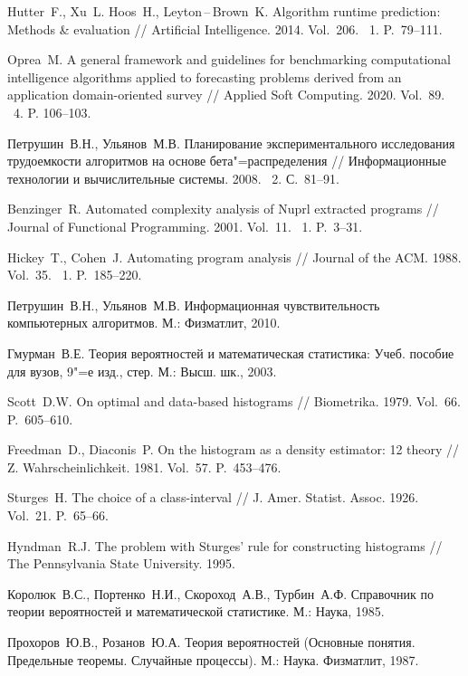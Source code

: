 \documentclass[a4paper, article, 14pt]{extarticle}
\newcommand*{\No}{\textnumero}
\begin{document}
\begin{thebibliography}{1}
	 Hutter~F., Xu~L. Hoos~H., Leyton\,--\,Brown~K. Algorithm runtime prediction: Methods \& evaluation // Artificial Intelligence. 2014. Vol.~206. \No~1. P.~79--111.

	 Oprea~M. A general framework and guidelines for benchmarking computational intelligence algorithms applied to forecasting problems derived from an application domain-oriented survey // Applied Soft Computing. 2020. Vol.~89. \No~4. P. 106--103.

	 Петрушин~В.\:Н., Ульянов~М.\:В. Планирование экспериментального исследования трудоемкости алгоритмов на основе бета"=распределения // Информационные технологии и вычислительные системы. 2008. \No~2. С.~81--91.

	 Benzinger~R. Automated complexity analysis of Nuprl extracted programs // Journal of Functional Programming. 2001. Vol.~11. \No~1. P.~3--31.
	
	 Hickey~T., Cohen~J. Automating program analysis // Journal of the ACM. 1988. Vol.~35. \No~1. P.~185--220.

	 Петрушин~В.\:Н., Ульянов~М.\:В. Информационная чувствительность компьютерных алгоритмов. М.: Физматлит, 2010.

	 Гмурман~В.\:Е. Теория вероятностей и математическая статистика: Учеб. пособие для вузов, 9"=е изд., стер. М.: Высш. шк., 2003.

	 Scott~D.\:W. On optimal and data-based histograms // Biometrika. 1979. Vol.~66. P.~605--610.
	
	 Freedman~D., Diaconis~P. On the histogram as a density estimator: 12 theory // Z. Wahrscheinlichkeit. 1981. Vol.~57. P.~453--476.

	 Sturges~H. The choice of a class-interval // J. Amer. Statist. Assoc. 1926.
	Vol.~21. P.~65--66.

	 Hyndman~R.\:J. The problem with Sturges' rule for constructing histograms // The Pennsylvania State University. 1995.

	 Королюк~В.\:С., Портенко~Н.\:И., Скороход~А.\:В., Турбин~А.\:Ф. Справочник по теории вероятностей и математической статистике. М.: Наука, 1985.

	 Прохоров~Ю.\:В., Розанов~Ю.\:А. Теория вероятностей (Основные понятия. Предельные теоремы. Случайные процессы). М.: Наука. Физматлит, 1987.


\end{thebibliography}
\end{document}

